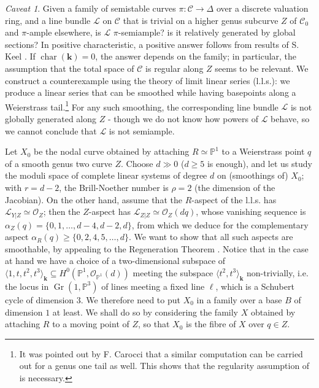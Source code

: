 \documentclass{compositio}
\newcommand{\PP}{\mathbb P}
\renewcommand{\k}{\mathbf k}
\newcommand{\OO}{\mathcal O}
\renewcommand{\to}{\rightarrow}
\newcommand{\dvr}{\Delta}
\theoremstyle{plain}
\theoremstyle{definition}
\theoremstyle{remark}
\newtheorem*{caveat}{Caveat}
\begin{document}
\begin{caveat} Given a family of semistable curves $\pi\colon\mathcal C\to\dvr$ over a discrete valuation ring, and a line bundle $\mathcal L$ on $\mathcal C$ that is trivial on a higher genus subcurve $Z$ of $\mathcal C_0$ and $\pi$-ample elsewhere, is $\mathcal L$ $\pi$-semiample? is it relatively generated by global sections? In positive characteristic, a positive answer follows from results of S. Keel \cite{Keel-bpf}. If $\operatorname{char}(\k)=0$, the answer depends on the family; in particular, the assumption that the total space of $\mathcal C$ is regular along $Z$ seems to be relevant. We construct a counterexample using the theory of limit linear series (l.l.s.): we produce a linear series that can be smoothed while having basepoints along a Weierstrass tail.\footnote{It was pointed out by F. Carocci that a similar computation can be carried out for a genus one tail as well. This shows that the regularity assumption of \cite[Lemma 2.13]{SMY1} is necessary.} For any such smoothing, the corresponding line bundle $\mathcal L$ is not globally generated along $Z$ - though we do not know how powers of $\mathcal L$ behave, so we cannot conclude that $\mathcal L$ is not semiample.
 
 Let $X_0$ be the nodal curve obtained by attaching $R\simeq\PP^1$ to a Weierstrass point $q$ of a smooth genus two curve $Z$. Choose $d\gg 0$ ($d\geq5$ is enough), and let us study the moduli space of complete linear systems of degree $d$ on (smoothings of) $X_0$; with $r=d-2$, the Brill-Noether number is $\rho=2$ (the dimension of the Jacobian). On the other hand, assume that the $R$-aspect of the l.l.s. has $\mathcal L_{Y|Z}\simeq\OO_Z$; then the $Z$-aspect has $\mathcal L_{Z|Z}\simeq\OO_Z(dq)$, whose vanishing sequence is $\alpha_Z(q)=\{0,1,\ldots,d-4,d-2,d\}$, from which we deduce for the complementary aspect $\alpha_R(q)\geq\{0,2,4,5,\ldots,d\}$. We want to show that all such aspects are smoothable, by appealing to the Regeneration Theorem \cite[Theorem 5.41]{HM}. Notice that in the case at hand we have a choice of a two-dimensional subspace of $\langle 1,t,t^2,t^3\rangle_\k\subseteq H^0(\PP^1,\OO_{\PP^1}(d))$ meeting the subspace $\langle t^2,t^3\rangle_\k$ non-trivially, i.e. the locus in $\operatorname{Gr}(1,\PP^3)$ of lines meeting a fixed line $\ell$, which is a Schubert cycle of dimension $3$. We therefore need to put $X_0$ in a family over a base $B$ of dimension $1$ at least.  We shall do so by considering the family $X$ obtained by attaching $R$ to a moving point of $Z$, so that $X_0$ is the fibre of $X$ over $q\in Z$.
 

\end{caveat}
\end{document}
